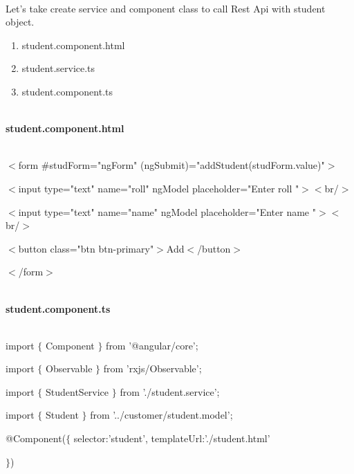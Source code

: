 \documentclass{article}
\begin{document}
\noindent 

\noindent 

\noindent 

\noindent 

\noindent \\ Let's take create service and component class to call Rest Api with student object.

\begin{enumerate}
	\item   student.component.html   
	\item   student.service.ts   
	\item   student.component.ts   
\end{enumerate}


\noindent \\ \textbf{student.component.html}

\noindent 

\noindent \\ $\mathrm{<}$form \#studForm="ngForm" (ngSubmit)="addStudent(studForm.value)"$\mathrm{>}$

\noindent $\mathrm{<}$input type="text" name="roll" ngModel placeholder="Enter  roll "$\mathrm{>}$$\mathrm{<}$br/$\mathrm{>}$

\noindent $\mathrm{<}$input type="text" name="name" ngModel placeholder="Enter name "$\mathrm{>}$$\mathrm{<}$br/$\mathrm{>}$

\noindent $\mathrm{<}$button class="btn btn-primary"$\mathrm{>}$Add$\mathrm{<}$/button$\mathrm{>}$

\noindent $\mathrm{<}$/form$\mathrm{>}$

\noindent  

\noindent 
\newpage
\noindent \\ \textbf{student.component.ts}

 

\noindent \\ import $\mathrm{\{}$ Component $\mathrm{\}}$ from '@angular/core'; 

\noindent import $\mathrm{\{}$ Observable $\mathrm{\}}$ from 'rxjs/Observable'; 

\noindent import $\mathrm{\{}$ StudentService $\mathrm{\}}$ from './student.service';

\noindent import $\mathrm{\{}$ Student $\mathrm{\}}$ from '../customer/student.model';

\noindent @Component($\mathrm{\{}$ selector:'student', templateUrl:'./student.html'

\noindent $\mathrm{\}}$)
\end{document}
